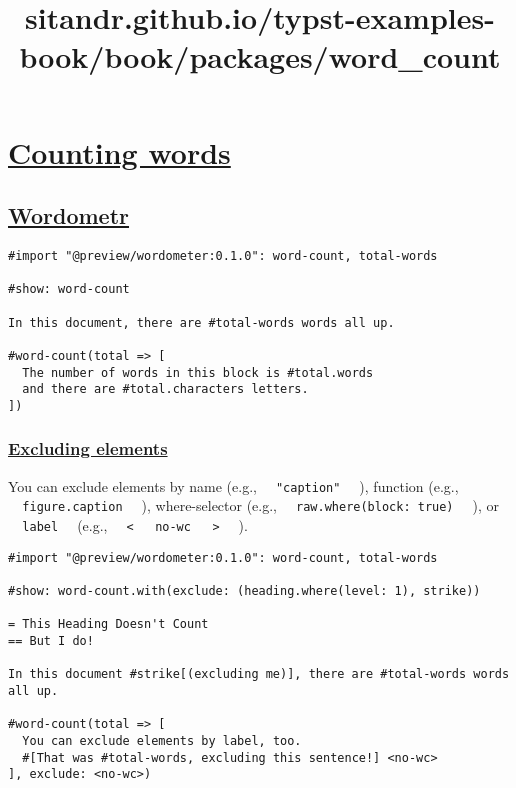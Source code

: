 \title{sitandr.github.io/typst-examples-book/book/packages/word_count}

\section{\texorpdfstring{\hyperref[counting-words]{Counting
words}}{Counting words}}\label{counting-words}

\subsection{\texorpdfstring{\hyperref[wordometr]{Wordometr}}{Wordometr}}\label{wordometr}

\begin{verbatim}
#import "@preview/wordometer:0.1.0": word-count, total-words

#show: word-count

In this document, there are #total-words words all up.

#word-count(total => [
  The number of words in this block is #total.words
  and there are #total.characters letters.
])
\end{verbatim}

\pandocbounded{}

\subsubsection{\texorpdfstring{\hyperref[excluding-elements]{Excluding
elements}}{Excluding elements}}\label{excluding-elements}

You can exclude elements by name (e.g.,
\texttt{\ }{\texttt{\ "caption"\ }}\texttt{\ } ), function (e.g.,
\texttt{\ }{\texttt{\ figure.caption\ }}\texttt{\ } ), where-selector
(e.g., \texttt{\ }{\texttt{\ raw.where(block:\ true)\ }}\texttt{\ } ),
or \texttt{\ }{\texttt{\ label\ }}\texttt{\ } (e.g.,
\texttt{\ }{\texttt{\ \textless{}\ }}\texttt{\ }{\texttt{\ no-wc\ }}\texttt{\ }{\texttt{\ \textgreater{}\ }}\texttt{\ }
).

\begin{verbatim}
#import "@preview/wordometer:0.1.0": word-count, total-words

#show: word-count.with(exclude: (heading.where(level: 1), strike))

= This Heading Doesn't Count
== But I do!

In this document #strike[(excluding me)], there are #total-words words all up.

#word-count(total => [
  You can exclude elements by label, too.
  #[That was #total-words, excluding this sentence!] <no-wc>
], exclude: <no-wc>)
\end{verbatim}

\pandocbounded{}
